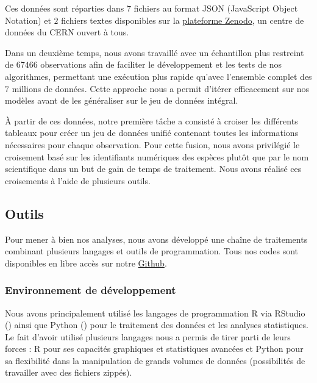 \documentclass[a4paper,12pt]{article}
\begin{document}
\vspace{0.2cm}

Ces données sont réparties dans $7$ fichiers au format JSON (JavaScript Object Notation) et $2$ fichiers textes disponibles sur la \href{https://zenodo.org/records/10782465}{plateforme Zenodo}, un centre de données du CERN ouvert à tous.

\vspace{0.2cm}

Dans un deuxième temps, nous avons travaillé avec un échantillon plus restreint de $\num{67 466}$ observations afin de faciliter le développement et les tests de nos algorithmes, permettant une exécution plus rapide qu'avec l'ensemble complet des $7$ millions de données. Cette approche nous a permit d'itérer efficacement sur nos modèles avant de les généraliser sur le jeu de données intégral.

\vspace{0.2cm}

À partir de ces données, notre première tâche a consisté à croiser les différents tableaux pour créer un jeu de données unifié contenant toutes les informations nécessaires pour chaque observation. Pour cette fusion, nous avons privilégié le croisement basé sur les identifiants numériques des espèces plutôt que par le nom scientifique dans un but de gain de temps de traitement. Nous avons réalisé ces croisements à l'aide de plusieurs outils.


\subsection{Outils}

Pour mener à bien nos analyses, nous avons développé une chaîne de traitements combinant plusieurs langages et outils de programmation. Tous nos codes sont disponibles en libre accès sur notre \href{https://github.com/lcletz/PLANTNET_M1_SSD}{Github}.

\subsubsection{Environnement de développement}

Nous avons principalement utilisé les langages de programmation R via RStudio (\cite{RStudio}) ainsi que Python (\cite{Python}) pour le traitement des données et les analyses statistiques. Le fait d'avoir utilisé plusieurs langages nous a permis de tirer parti de leurs forces : R pour ses capacités graphiques et statistiques avancées et Python pour sa flexibilité dans la manipulation de grands volumes de données (possibilités de travailler avec des fichiers zippés).
\end{document}
